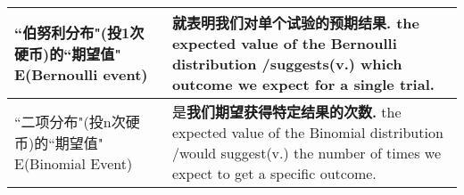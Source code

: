 \documentclass[UTF8]{ctexart}
\begin{document}
	
	\begin{tabular}{|p{}|p{}|}
		\hline
		 ``伯努利分布"(投1次硬币)的``期望值" E(Bernoulli event) &  就\textbf{表明我们对单个试验的预期结果.} the expected value of the Bernoulli distribution /suggests(v.) which outcome we expect for a single trial.\\
		\hline
		``二项分布"(投n次硬币)的``期望值" E(Binomial Event) &  是\textbf{我们期望获得特定结果的次数.} the expected value of the Binomial distribution /would suggest(v.) the number of times we expect to get a specific outcome. \\
		\hline
	\end{tabular}

	
	
	
\end{document}
